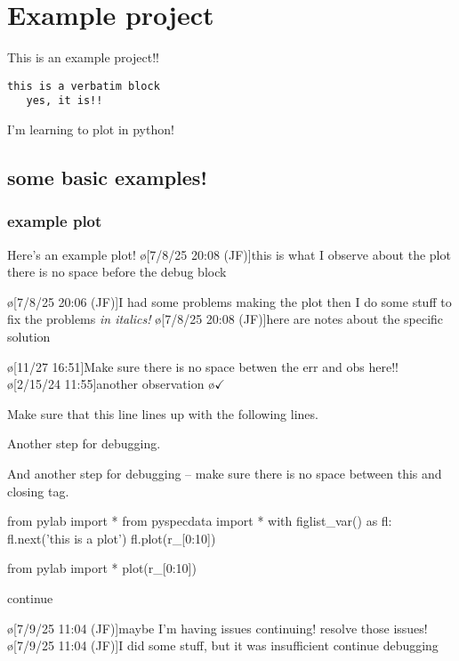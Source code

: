\section{Example project}
This is an example project!!
\begin{verbatim}
this is a verbatim block
   yes, it is!!
\end{verbatim}
I'm learning to plot in python!

\subsection{some basic examples!}
\subsubsection{example plot}\label{sec:examplePlot1}
Here's an example plot!
\o[7/8/25 20:08 (JF)]{this is what I observe about the plot there is no space before the debug block}
\begin{err}
    \o[7/8/25 20:06 (JF)]{I had some problems making the plot}
    then I do some stuff to fix the problems
    \textit{in italics!}
    \o[7/8/25 20:08 (JF)]{here are notes about the specific solution}
\end{err}
\o[11/27 16:51]{Make sure there is no space betwen the err and obs here!!}
\o[2/15/24 11:55]{another observation}
\o{$\checkmark$}

\begin{err}
    Make sure that this line lines up with the following lines.

    Another step for debugging.

    And another step for debugging -- make sure there is no space between this and closing tag.
\end{err}
\par
\begin{python}[on]
from pylab import *
from pyspecdata import *
with figlist_var() as fl:
    fl.next('this is a plot')
    fl.plot(r_[0:10])
\end{python}
\par
\par
\begin{python}[on]
from pylab import *
plot(r_[0:10])
\end{python}
\par
continue

\begin{err}
    \o[7/9/25 11:04 (JF)]{maybe I'm having issues continuing!}
    resolve those issues!
    \o[7/9/25 11:04 (JF)]{I did some stuff, but it was insufficient}
    continue debugging

\end{err}
